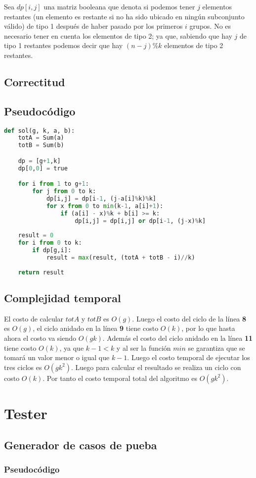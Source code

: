 \documentclass{article}
\begin{document}
Sea $dp[i,j]$ una matriz booleana que denota si podemos tener $j$ elementos restantes 
(un elemento es restante si no ha sido ubicado en ningún subconjunto válido) 
de tipo 1 después de haber pasado por los primeros $i$ grupos. No es necesario 
tener en cuenta los elementos de tipo 2; ya que, sabiendo que hay $j$ de tipo 1 restantes
podemos decir que hay $(n-j)\%k$ elementos de tipo 2 restantes. 

\subsection*{Correctitud}

\subsection*{Pseudocódigo}

\begin{lstlisting}[language = Python]
def sol(g, k, a, b):
    totA = Sum(a)
    totB = Sum(b)

    dp = [g+1,k]
    dp[0,0] = true

    for i from 1 to g+1:
        for j from 0 to k:
            dp[i,j] = dp[i-1, (j-a[i]%k)%k]
            for x from 0 to min(k-1, a[i]+1):
                if (a[i] - x)%k + b[i] >= k:
                    dp[i,j] = dp[i,j] or dp[i-1, (j-x)%k]
    
    result = 0
    for i from 0 to k:
        if dp[g,i]:
            result = max(result, (totA + totB - i)//k)
    
    return result
\end{lstlisting}

\subsection*{Complejidad temporal}
El costo de calcular $totA$ y  $totB$ es $O(g)$. Luego el costo del ciclo 
de la línea \textbf{8} es $O(g)$, el ciclo anidado en la línea \textbf{9} 
tiene costo $O(k)$, por lo que hasta ahora el costo va siendo $O(gk)$. Además 
el costo del ciclo anidado en la línea \textbf{11} tiene costo $O(k)$, ya que 
$k-1 < k$ y al ser la función $min$ se garantiza que se tomará un valor menor
o igual que $k-1$. Luego el costo temporal de ejecutar los tres ciclos es $O(gk^2)$.
Luego para calcular el resultado se realiza un ciclo con costo $O(k)$.
Por tanto el costo temporal total del algoritmo es $O(gk^2)$.
\section*{Tester}

\subsection*{Generador de casos de pueba}

\subsubsection*{Pseudocódigo}
\end{document}

